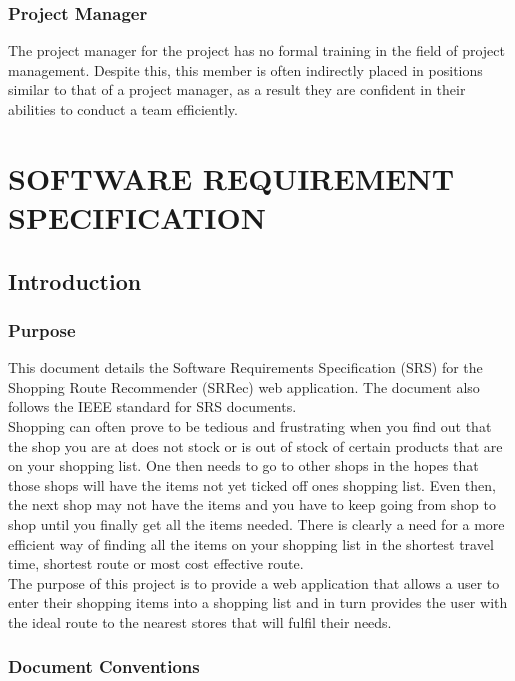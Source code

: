 \documentclass[10pt,twocolumn]{witseiepaper}
\begin{document}
		\subsubsection{Project Manager} The project manager for the project has no formal training in the field of project management. Despite this, this member is often indirectly placed in positions similar to that of a project manager, as a result they are confident in their abilities to conduct a team efficiently. \\

\section{SOFTWARE REQUIREMENT SPECIFICATION}
	
	\subsection{Introduction}
		
		\subsubsection{Purpose}
		
			This document details the Software Requirements Specification (SRS) for the Shopping Route Recommender (SRRec) web application. The document also follows the IEEE standard for SRS documents.\\
			
			Shopping can often prove to be tedious and frustrating when you find out that the shop you are at does not stock or is out of stock of certain products that are on your shopping list. One then needs to go to other shops in the hopes that those shops will have the items not yet ticked off ones shopping list. Even then, the next shop may not have the items and you have to keep going from shop to shop until you finally get all the items needed. There is clearly a need for a more efficient way of finding all the items on your shopping list in the shortest travel time, shortest route or most cost effective route.\\
			
			The purpose of this project is to provide a web application that allows a user to enter their shopping items into a shopping list and in turn provides the user with the ideal route to the nearest stores that will fulfil their needs.
		
		\subsubsection{Document Conventions}
		
\end{document}
